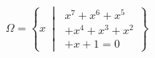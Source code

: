 \newcommand\Set[2]{%
  \left\{#1\ \middle\vert\ #2 \right\}}
\[  \Omega = \Set{x}{\begin{multlined}
x^7+x^6+x^5 \\ +x^4+x^3+x^2 \\ +x+1=0
\end{multlined}}  \]
